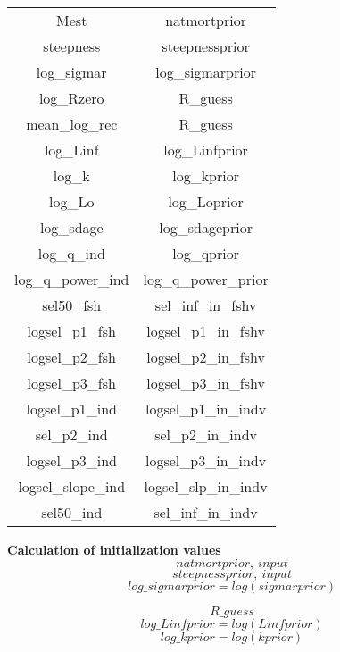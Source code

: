 \documentclass{article}
\begin{document}
\begin{tabular}{c c}
    Mest & natmortprior \\
     steepness & steepnessprior \\
     log\_sigmar & log\_sigmarprior \\
     log\_Rzero &    R\_guess\\
     mean\_log\_rec 
 & R\_guess\\
 log\_Linf  &  log\_Linfprior\\
  log\_k &       log\_kprior\\
  log\_Lo &      log\_Loprior\\
  log\_sdage &  log\_sdageprior\\
   log\_q\_ind & log\_qprior\\ 
  log\_q\_power\_ind & log\_q\_power\_prior\\
  sel50\_fsh & sel\_inf\_in\_fshv\\
  logsel\_p1\_fsh &   logsel\_p1\_in\_fshv \\
  logsel\_p2\_fsh &   logsel\_p2\_in\_fshv\\
  logsel\_p3\_fsh &  logsel\_p3\_in\_fshv \\
  logsel\_p1\_ind &   logsel\_p1\_in\_indv \\
  sel\_p2\_ind  &       sel\_p2\_in\_indv \\
  logsel\_p3\_ind &   logsel\_p3\_in\_indv\\
  logsel\_slope\_ind & logsel\_slp\_in\_indv \\
  sel50\_ind & sel\_inf\_in\_indv 
\end{tabular}


\textbf{Calculation of initialization values}\\
\begin{equation}
    natmortprior, \ input
\end{equation}
\begin{equation}
    steepnessprior, \ input
\end{equation}
\begin{equation}
log\_sigmarprior = log(sigmarprior)
\end{equation}

\begin{equation} R\_guess
\end{equation}
\begin{equation}
log\_Linfprior = log(Linfprior)
\end{equation}
\begin{equation}
    log\_kprior = log(kprior)
\end{equation}
\end{document}
